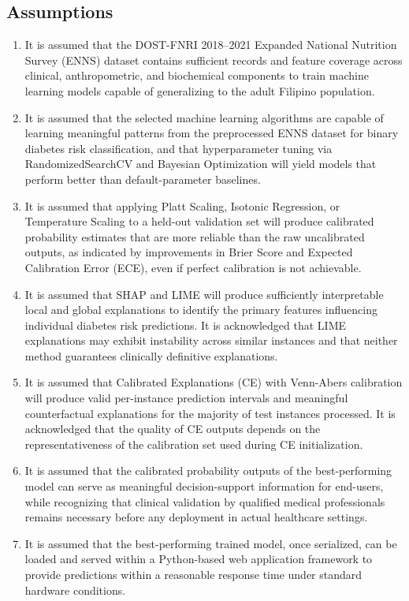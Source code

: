 \subsection{Assumptions}
\begin{enumerate}
    \item It is assumed that the DOST-FNRI 2018--2021 Expanded National Nutrition Survey (ENNS) dataset contains sufficient records and feature coverage across clinical, anthropometric, and biochemical components to train machine learning models capable of generalizing to the adult Filipino population.

    \item It is assumed that the selected machine learning algorithms are capable of learning meaningful patterns from the preprocessed ENNS dataset for binary diabetes risk classification, and that hyperparameter tuning via RandomizedSearchCV and Bayesian Optimization will yield models that perform better than default-parameter baselines.

    \item It is assumed that applying Platt Scaling, Isotonic Regression, or Temperature Scaling to a held-out validation set will produce calibrated probability estimates that are more reliable than the raw uncalibrated outputs, as indicated by improvements in Brier Score and Expected Calibration Error (ECE), even if perfect calibration is not achievable.

    \item It is assumed that SHAP and LIME will produce sufficiently interpretable local and global explanations to identify the primary features influencing individual diabetes risk predictions. It is acknowledged that LIME explanations may exhibit instability across similar instances and that neither method guarantees clinically definitive explanations.

    \item It is assumed that Calibrated Explanations (CE) with Venn-Abers calibration will produce valid per-instance prediction intervals and meaningful counterfactual explanations for the majority of test instances processed. It is acknowledged that the quality of CE outputs depends on the representativeness of the calibration set used during CE initialization.

    \item It is assumed that the calibrated probability outputs of the best-performing model can serve as meaningful decision-support information for end-users, while recognizing that clinical validation by qualified medical professionals remains necessary before any deployment in actual healthcare settings.

    \item It is assumed that the best-performing trained model, once serialized, can be loaded and served within a Python-based web application framework to provide predictions within a reasonable response time under standard hardware conditions.

\end{enumerate}